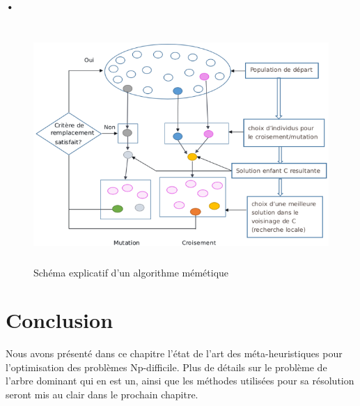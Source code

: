 \begin{enumerate}[label=\alph*)]
\begin{algorithm}[H]
\end{algorithm}

\paragraph{•}

\begin{figure}[h]
	\centering
	\includegraphics[width=15cm,height=9cm]{Chap3/7.png}
	\caption{Schéma explicatif d’un algorithme mémétique}
	\label{fig:CSF}
\end{figure}
	
\end{enumerate}


\section{Conclusion}
Nous avons présenté dans ce chapitre l’état de l’art des méta-heuristiques pour l’optimisation des problèmes Np-difficile. Plus de détails sur le problème de l’arbre dominant qui en est un, ainsi que les méthodes utilisées pour sa résolution seront mis au clair dans le prochain chapitre.

